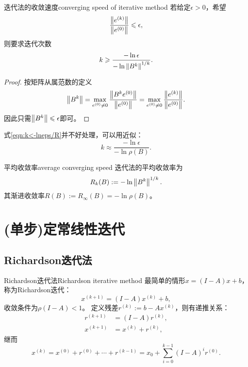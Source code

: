 \begin{theorem}
    {迭代法的收敛速度}{converging speed of iterative method}
    若给定$\epsilon>0$，希望
    \[
        \frac{\left\lVert e^{(k)}\right\rVert}{\left\lVert e^{(0)}\right\rVert}\leqslant\epsilon,
    \]
    则要求迭代次数
    \begin{equation}
        \label{eqn:k<-lneps/R}
        k\geqslant\frac{-\ln\epsilon}{-\ln\left\lVert B^k\right\rVert^{1/k}}.
    \end{equation}
\end{theorem}

\begin{proof}
    按矩阵从属范数的定义
    \[
        \left\lVert B^k\right\rVert=\max_{e^{(0)}\neq 0}\frac{\left\lVert B^ke^{(0)}\right\rVert}{\left\lVert e^{(0)}\right\rVert}=\max_{e^{(0)}\neq 0}\frac{\left\lVert e^{(k)}\right\rVert}{\left\lVert e^{(0)}\right\rVert}.
    \]
    因此只需$\left\lVert B^k\right\rVert\leqslant\epsilon$即可。
\end{proof}

\begin{remark}
    式\eqref{eqn:k<-lneps/R}并不好处理，可以用近似：
    \[
        k\approx\frac{-\ln\epsilon}{-\ln\rho(B)}.
    \]
\end{remark}

\begin{definition}
    {平均收敛率}{average converging speed}
    迭代法的平均收敛率为
    \begin{equation}
        R_k(B):=-\ln\left\lVert B^k\right\rVert^{1/k}.
    \end{equation}
    其渐进收敛率$R(B):=R_\infty(B)=-\ln\rho(B)$。
\end{definition}

\section{(单步)定常线性迭代}

\subsection{Richardson迭代法}

\begin{example}
    {Richardson迭代法}{Richardson iterative method}
    最简单的情形$x=(I-A)x+b$，称为Richardson迭代：
    \begin{equation}
        x^{(k+1)}=(I-A)x^{(k)}+b,
    \end{equation}
    收敛条件为$\rho(I-A)<1$。
    定义残差$r^{(k)}:=b-Ax^{(k)}$，则有递推关系：
    \begin{align*}
        r^{(k+1)}&=(I-A)r^{(k)},\\
        x^{(k+1)}&=x^{(k)}+r^{(k)},
    \end{align*}
    继而
    \[
        x^{(k)}=x^{(0)}+r^{(0)}+\cdots+r^{(k-1)}=x_0+\sum_{i=0}^{k-1}(I-A)^ir^{(0)}.
    \]
    
\end{example}

